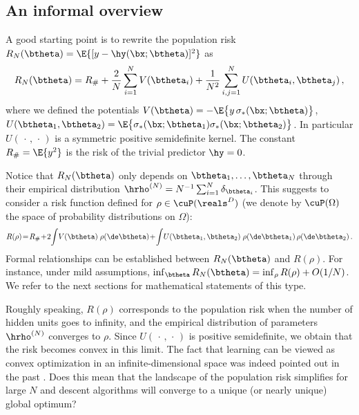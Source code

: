 \documentclass[11pt]{article}
\begin{document}
\subsection{An informal overview}
\label{sec:Overview}

A good starting point is to rewrite the population risk $R_{N}(\btheta) = \E\{[y-\hy(\bx;\btheta)]^2\}$ as
%
\begin{equation}
%
R_{N}(\btheta) = R_{\#}+\frac{2}{N}\sum_{i=1}^NV(\btheta_i) +\frac{1}{N^2}\sum_{i,j=1}^NU(\btheta_i,\btheta_j)\, ,\label{eq:R0N}
%
\end{equation}
%
where we defined the potentials $V(\btheta) = - \E\big\{y\,\sigma_*(\bx;\btheta)\big\}$, 
$U(\btheta_1,\btheta_2) = \E\big\{\sigma_*(\bx;\btheta_1) \sigma_*(\bx;\btheta_2)\big\}$.
In particular  $U(\,\cdot\,,\,\cdot\,)$ is a symmetric positive semidefinite kernel.
The constant $R_{\#}=\E\{y^2\}$ is the risk of the trivial predictor $\hy=0$.

Notice that $R_{N}(\btheta)$ only depends on $\btheta_1,\dots,\btheta_N$ through their empirical
distribution $\hrho^{(N)}=N^{-1}\sum_{i=1}^N \delta_{\btheta_i}$. This  suggests to consider 
a risk function defined for  $\rho\in\cuP(\reals^D)$ (we denote by $\cuP(\Omega)$ the space of probability distributions on $\Omega$):
%
\begin{equation}
%
R(\rho) \! = \! R_{\#}\!+\!2\!\int \!V(\btheta)\; \rho(\de\btheta) \!+\!\int \!U(\btheta_1,\btheta_2)\; \rho(\de\btheta_1)\, \rho(\de\btheta_2)\, . \label{eq:DensityRisk}
%
\end{equation}
%
Formal relationships can be established between $R_{N}(\btheta)$ and $R(\rho)$.
For instance, under mild assumptions,  $\inf_{\btheta}R_{N}(\btheta)=\inf_{\rho}R(\rho)+O(1/N)$. 
We refer to the next sections for mathematical statements of this type.

Roughly speaking, $R(\rho)$ corresponds to the population risk when the number of hidden units 
goes to infinity, and the empirical distribution of parameters $\hrho^{(N)}$ converges to $\rho$. Since $U(\,\cdot\,,\,\cdot\,)$ is positive semidefinite,
we obtain that the risk becomes convex in this limit. The fact that learning can be viewed
as convex optimization in an infinite-dimensional space was indeed pointed out  in the past \cite{lee1996efficient,bengio2006convex}. 
Does this mean that the landscape of the population risk simplifies for large $N$ 
and descent algorithms will converge to a unique (or nearly unique) global optimum?
\end{document}
